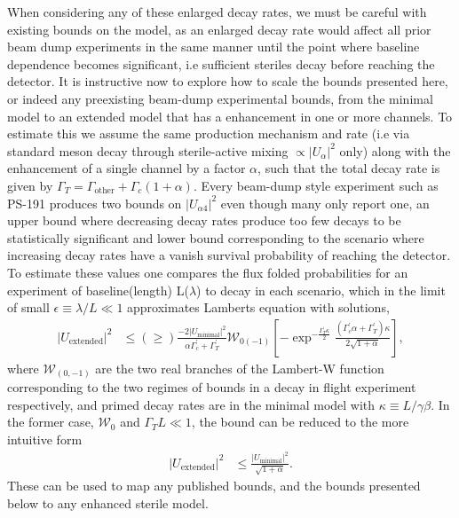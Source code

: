 \documentclass[11pt, a4paper]{article}
\begin{document}
When considering any of these enlarged decay rates, we must be careful with
existing bounds on the model, as an enlarged decay rate would affect all prior
beam dump experiments in the same manner until the point where baseline dependence
becomes significant, i.e sufficient steriles decay before reaching the detector. It is instructive now to explore how to scale the bounds
presented here, or indeed any preexisting beam-dump experimental bounds, from
the minimal model to an extended model that has a enhancement in one or more
channels. To estimate this we assume the same production mechanism and rate
(i.e via standard meson decay through sterile-active mixing $\propto
|U_{\alpha}|^2$ only) along with the enhancement of a single channel by a
factor $\alpha$, such that the total decay rate is given by $\Gamma_T =
\Gamma_\text{other}+\Gamma_c (1+\alpha)$. Every beam-dump style experiment such as PS-191
produces two bounds on $|U_{\alpha 4}|^2$ even though many only report one, an
upper bound where decreasing decay rates produce too few decays to be
statistically significant and lower bound corresponding to the scenario where
increasing decay rates have a vanish survival probability of reaching the
detector. To estimate these values one compares the flux folded probabilities
for an experiment of baseline(length) L($\lambda$) to decay in each scenario,
which in the limit of small $\epsilon \equiv \lambda/L \ll 1$ approximates
Lamberts equation with solutions, \begin{align*} |U_\text{extended}|^2 &\leq (\geq)
\frac{-2 |U_\text{minimal}|^2}{\alpha \Gamma^\prime_c +\Gamma^\prime_T}
\mathcal{W}_{0(-1)}\left[-\exp^{-\frac{\Gamma^\prime_T \kappa}{2}}
\frac{(\Gamma^\prime_c \alpha + \Gamma^\prime_T)\kappa}{2\sqrt{1+\alpha}}
\right], \end{align*} where $\mathcal{W}_{(0,-1)}$ are the two real branches of
the Lambert-W function corresponding to the two regimes of bounds in a decay in
flight experiment respectively, and primed decay rates are in the minimal model
with $\kappa \equiv L/\gamma \beta$. In the former case, $\mathcal{W}_0$ and
$\Gamma_T L \ll 1$, the bound can be reduced to the more intuitive form
\begin{align*} |U_\text{extended}|^2 &\leq
\frac{|U_{\text{minimal}}|^2}{\sqrt{1+\alpha}}.  \end{align*} These can be used
to map any published bounds, and the bounds presented below to any enhanced sterile
model.\\
\end{document}
